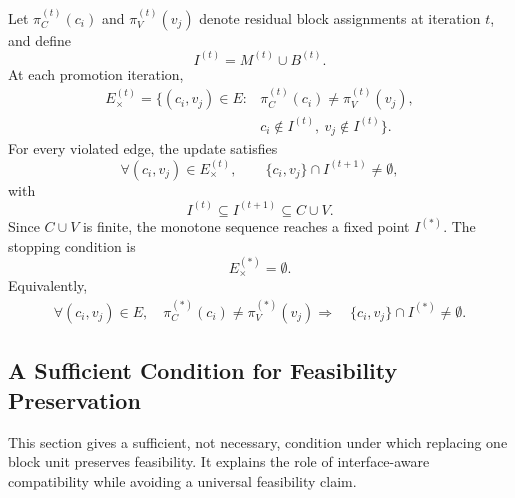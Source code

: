 \documentclass[letterpaper]{article}
\begin{document}
Let $\pi_C^{(t)}(c_i)$ and $\pi_V^{(t)}(v_j)$ denote residual block
assignments at iteration $t$, and define
\begin{equation}
I^{(t)}=M^{(t)}\cup B^{(t)} .
\end{equation}
At each promotion iteration,
\begin{equation}
\begin{aligned}
E_{\times}^{(t)}=
\{(c_i,v_j)\in E:&\pi_C^{(t)}(c_i)\ne \pi_V^{(t)}(v_j),\\
&c_i\notin I^{(t)},\ v_j\notin I^{(t)}\}.
\end{aligned}
\end{equation}
For every violated edge, the update satisfies
\begin{equation}
\forall (c_i,v_j)\in E_{\times}^{(t)},\qquad
\{c_i,v_j\}\cap I^{(t+1)}\ne\emptyset ,
\end{equation}
with
\begin{equation}
I^{(t)}\subseteq I^{(t+1)}\subseteq C\cup V .
\end{equation}
Since $C\cup V$ is finite, the monotone sequence reaches a fixed point
$I^{(*)}$. The stopping condition is
\begin{equation}
E_{\times}^{(*)}=\emptyset .
\end{equation}
Equivalently,
\begin{equation}
\begin{aligned}
\forall (c_i,v_j)\in E,\quad
\pi_C^{(*)}(c_i)\ne \pi_V^{(*)}(v_j)
\Rightarrow\quad
\{c_i,v_j\}\cap I^{(*)}\ne\emptyset .
\end{aligned}
\end{equation}

\subsection{A Sufficient Condition for Feasibility Preservation}

This section gives a sufficient, not necessary, condition under which
replacing one block unit preserves feasibility. It explains the role of
interface-aware compatibility while avoiding a universal
feasibility claim.
\end{document}
